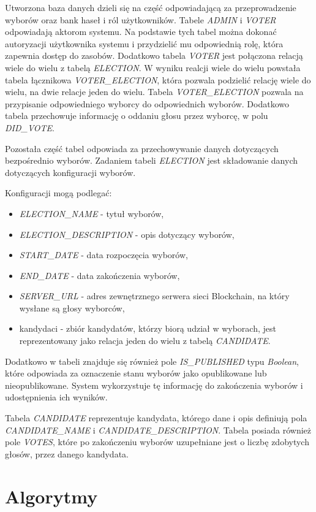 \documentclass[a4paper,12pt]{book}
\begin{document}
Utworzona baza danych dzieli się na część odpowiadającą za przeprowadzenie wyborów oraz bank haseł i ról użytkowników. Tabele \textit{ADMIN} i \textit{VOTER} odpowiadają aktorom systemu. Na podstawie tych tabel można dokonać autoryzacji użytkownika systemu i przydzielić mu odpowiednią rolę, która zapewnia dostęp do zasobów. Dodatkowo tabela \textit{VOTER} jest połączona relacją wiele do wielu z tabelą \textit{ELECTION}. W wyniku realcji wiele do wielu powstała tabela łącznikowa \textit{VOTER\_ELECTION}, która pozwala podzielić relację wiele do wielu, na dwie relacje jeden do wielu. Tabela \textit{VOTER\_ELECTION} pozwala na przypisanie odpowiedniego wyborcy do odpowiednich wyborów. Dodatkowo tabela przechowuje informację o oddaniu głosu przez wyborcę, w polu \textit{DID\_VOTE}.

Pozostała część tabel odpowiada za przechowywanie danych dotyczących bezpośrednio wyborów. Zadaniem tabeli \textit{ELECTION} jest składowanie danych dotyczących konfiguracji wyborów. 

Konfiguracji mogą podlegać:
\begin{itemize}
	\item \textit{ELECTION\_NAME} - tytuł wyborów,
	\item \textit{ELECTION\_DESCRIPTION} - opis dotyczący wyborów,
	\item \textit{START\_DATE} - data rozpoczęcia wyborów,
	\item \textit{END\_DATE} - data zakończenia wyborów,
	\item \textit{SERVER\_URL} - adres zewnętrznego serwera sieci Blockchain, na który wysłane są głosy wyborców,
	\item kandydaci - zbiór kandydatów, którzy biorą udział w wyborach, jest reprezentowany jako relacja jeden do wielu z tabelą \textit{CANDIDATE}.
\end{itemize}

Dodatkowo w tabeli znajduje się również pole \textit{IS\_PUBLISHED} typu \textit{Boolean}, które odpowiada za oznaczenie stanu wyborów jako opublikowane lub nieopublikowane. System wykorzystuje tę informację do zakończenia wyborów i udostępnienia ich wyników.

Tabela \textit{CANDIDATE} reprezentuje kandydata, którego dane i opis definiują pola \textit{CANDIDATE\_NAME} i \textit{CANDIDATE\_DESCRIPTION}. Tabela posiada również pole \textit{VOTES}, które po zakończeniu wyborów uzupełniane jest o liczbę zdobytych głosów, przez danego kandydata.

\section{Algorytmy}
\end{document}
